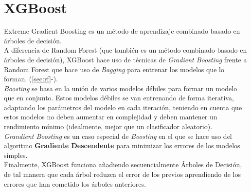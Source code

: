\section{XGBoost}
Extreme Gradient Boosting es un método de aprendizaje combinado basado en árboles de decisión.\\
A diferencia de Random Forest (que también es un método combinado basado en árboles de decisión), XGBoost hace uso de técnicas de \textit{Gradient Boosting} frente a Random Forest que hace uso de \textit{Bagging} para entrenar los modelos que lo forman. (\ref{sec:rf}-).\\
\linebreak
\textit{Boosting} se basa en la unión de varios modelos débiles para formar un modelo que en conjunto. Estos modelos débiles se van entrenando de forma iterativa, adaptando los parámetros del modelo en cada iteración, teniendo en cuenta que estos modelos no deben aumentar en complejidad y deben mantener un rendimiento mínimo (idealmente, mejor que un clasificador aleatorio).\\
\linebreak
\textit{Grandient Boosting} es un caso especial de \textit{Boosting} en el que se hace uso del algoritmo \textbf{Gradiente Descendente} para minimizar los errores de los modelos simples.\\
\linebreak
Finalmente, XGBoost funciona añadiendo secuencialmente Árboles de Decisión, de tal manera que cada árbol reduzca el error de los previos aprendiendo de los errores que han cometido los árboles anteriores.
